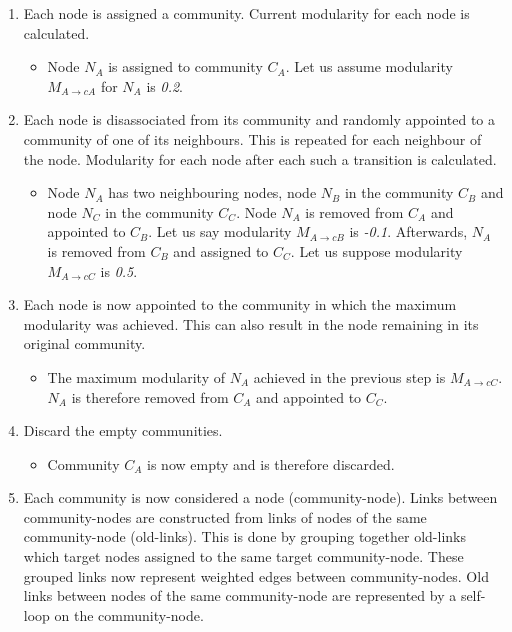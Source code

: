 \begin{enumerate} [label=\alph*)]
  \label{louvainAlgorithmPrinciple}
  \item  Each node is assigned a community. Current modularity for each node is calculated. 
  \label{LA1}
  \begin{itemize}
    \item Node $N_{A}$ is assigned to community $C_{A}$. Let us assume modularity $M_{A\rightarrow cA}$ for $N_{A}$ is \textit{0.2}.
  \end{itemize} 
  \item Each node is disassociated from its community and randomly appointed to a community of one of its neighbours. This is repeated for each neighbour of the node. Modularity for each node after each such a transition is calculated.
  \label{LA2}
  \begin{itemize}
    \item Node $N_{A}$ has two neighbouring nodes, node $N_{B}$ in the community $C_{B}$ and node $N_{C}$ in the community $C_{C}$. Node $N_{A}$ is removed from $C_{A}$ and appointed to $C_{B}$. Let us say modularity $M_{A\rightarrow cB}$ is \textit{-0.1}. Afterwards, $N_{A}$ is removed from $C_{B}$ and assigned to $C_{C}$. Let us suppose modularity $M_{A\rightarrow cC}$ is \textit{0.5}. 
  \end{itemize} 
  \item Each node is now appointed to the community in which the maximum modularity was achieved. This can also result in the node remaining in its original community.
  \label{LA3}
  \begin{itemize}
    \item The maximum modularity of $N_{A}$ achieved in the previous step is $M_{A\rightarrow cC}$. $N_{A}$ is therefore removed from $C_{A}$ and appointed to $C_{C}$.
  \end{itemize} 
  \item Discard the empty communities. 
  \label{LA4}
  \begin{itemize}
    \item Community $C_{A}$ is now empty and is therefore discarded.
  \end{itemize} 
  \item Each community is now considered a node (community-node). Links between community-nodes are constructed from links of nodes of the same community-node (old-links). This is done by grouping together old-links which target nodes assigned to the same target community-node. These grouped links now represent weighted edges between community-nodes. Old links between nodes of the same community-node are represented  by a self-loop on the community-node.

\end{enumerate}

